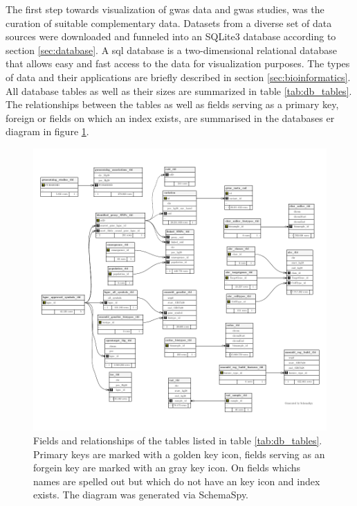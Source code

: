     The first step towards visualization of \ac{gwas} data and \ac{gwas} studies, was the curation of suitable complementary data. Datasets from a diverse set of data sources were downloaded and funneled into an SQLite3 database according to section \ref{sec:database}. A \ac{sql} database is a two-dimensional relational database that allows easy and fast access to the data for visualization purposes. The types of data and their applications are briefly described in section \ref{sec:bioinformatics}. All database tables as well as their sizes are summarized in table \ref{tab:db_tables}. The relationships between the tables as well as fields serving as a primary key, foreign or fields on which an index exists, are summarised in the databases \ac{er} diagram in figure \ref{fig:db_er}.

    \begin{figure}[h!]
    \capstart
        \centering
        \includegraphics{Abbildung/db-schema.pdf}

        \begin{minipage}{\captionwidth}
            \caption[database]{\newline
            Fields and relationships of the tables listed in table \ref{tab:db_tables}. Primary keys are marked with a golden key icon, fields serving as an forgein key are marked with an gray key icon. On fields whichs names are spelled out but which do not have an key icon and index exists. The diagram was generated via SchemaSpy.}
            \label{fig:db_er}
        \end{minipage}
    \end{figure}

